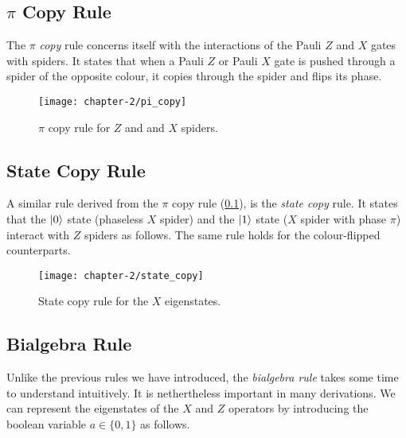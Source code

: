
\subsection{$\pi$ Copy Rule}%
\label{pi-copy}
The $\pi$ \textit{copy} rule concerns itself with the interactions of the Pauli $Z$ and $X$ gates with spiders. It states that when a Pauli $Z$ or Pauli $X$ gate is pushed through a spider of the opposite colour, it copies through the spider and flips its phase.
\begin{figure}[H]
    \centering
    \texttt{[image: chapter-2/pi\_copy]}
    \caption{$\pi$ copy rule for $Z$ and and $X$ spiders.}
\end{figure}


\subsection{State Copy Rule}%
\label{state-copy}
A similar rule derived from the $\pi$ copy rule (\ref{pi-copy}), is the \textit{state copy} rule. It states that the $\ket 0$ state (phaseless $X$ spider) and the $\ket 1$ state ($X$ spider with phase $\pi$) interact with $Z$ spiders as follows. The same rule holds for the colour-flipped counterparts.
\begin{figure}[H]
    \centering
    \texttt{[image: chapter-2/state\_copy]}
    \caption{State copy rule for the $X$ eigenstates.}
\end{figure}


\subsection{Bialgebra Rule}%
\label{bialgebra}
Unlike the previous rules we have introduced, the \textit{bialgebra rule} takes some time to understand intuitively. It is nethertheless important in many derivations. We can represent the eigenstates of the $X$ and $Z$ operators by introducing the boolean variable $a \in \{0, 1\}$ as follows.
\begin{center}
\end{center}

